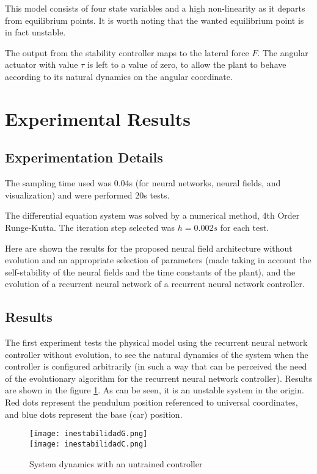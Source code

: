 This model consists of four state variables and a high non-linearity
as it departs from equilibrium points. It is worth noting that the
wanted equilibrium point is in fact unstable.

The output from the stability controller maps to the lateral force
$F$. The angular actuator with value $\tau$ is left to a value of
zero, to allow the plant to behave according to its natural dynamics
on the angular coordinate.


\section{Experimental Results}
\subsection*{Experimentation Details}
The sampling time used was 0.04s (for neural networks, neural fields, and
visualization) and were performed 20s tests.

The differential equation system was solved by a numerical method,
4th Order Runge-Kutta. The iteration step selected was $h=0.002s$ for
each test.

Here are shown the results for the proposed neural field architecture
without evolution and an appropriate selection of parameters (made
taking in account the self-stability of the neural fields and the time
constants of the plant), and the evolution of a recurrent neural
network of a recurrent neural network controller.

\subsection*{Results}
The first experiment tests the physical model using the recurrent
neural network controller without evolution, to see the natural dynamics of the system when the
controller is configured arbitrarily (in such a way that can be perceived
the need of the evolutionary algorithm for the recurrent neural
network controller). Results are shown in the figure
\ref{inestabilidad}. As can be seen, it is an unstable system in the
origin. Red dots represent the pendulum position referenced to
universal coordinates, and blue dots represent the base (car)
position.


\begin{figure}[t]
\centering
\texttt{[image: inestabilidadG.png]}
\\
\texttt{[image: inestabilidadC.png]}
\caption{System dynamics with an untrained controller}
\label{inestabilidad}
\end{figure}


